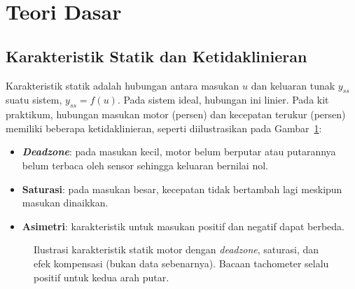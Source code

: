 \documentclass[11pt,a4paper]{article}
\begin{document}
\section{Teori Dasar}
\label{sec:teori}
\subsection{Karakteristik Statik dan Ketidaklinieran}
Karakteristik statik adalah hubungan antara masukan $u$ dan keluaran tunak $y_{ss}$ suatu sistem, $y_{ss} = f(u)$. Pada sistem ideal, hubungan ini linier. Pada kit praktikum, hubungan masukan motor (persen) dan kecepatan terukur (persen) memiliki beberapa ketidaklinieran, seperti diilustrasikan pada Gambar~\ref{fig:statik}:
\begin{itemize}
	\item \textbf{\textit{Deadzone}}: pada masukan kecil, motor belum berputar atau putarannya belum terbaca oleh sensor sehingga keluaran bernilai nol.
	\item \textbf{Saturasi}: pada masukan besar, kecepatan tidak bertambah lagi meskipun masukan dinaikkan.
	\item \textbf{Asimetri}: karakteristik untuk masukan positif dan negatif dapat berbeda.
\end{itemize}

\begin{figure}[H]
	\centering
	\caption{Ilustrasi karakteristik statik motor dengan \textit{deadzone}, saturasi, dan efek kompensasi (bukan data sebenarnya). Bacaan tachometer selalu positif untuk kedua arah putar.}
	\label{fig:statik}
\end{figure}
\end{document}
